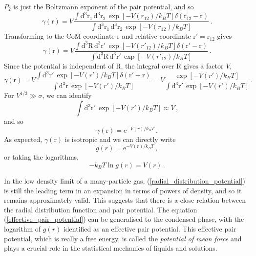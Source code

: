 \documentclass{article}
\theoremstyle{plain}\theoremheaderfont{\normalfont\itshape}\theorembodyfont{\rmfamily}\theoremseparator{.}\newtheorem*{rem}{Remark}\newtheorem*{ex}{Example}\newtheorem*{proof}{Proof}\newtheorem*{altp}{Alternative proof}
\theoremstyle{plain}\theoremheaderfont{\normalfont\bfseries}\theorembodyfont{\rmfamily}\theoremseparator{.}\newtheorem{thm}{Theorem}[section]\newtheorem{lem}[thm]{Lemma}\newtheorem{prop}[thm]{Proposition}\newtheorem*{cor}{Corollary}\newtheorem{defn}[thm]{Definition}\newtheorem{clm}[thm]{Claim}\newtheorem{clminproof}{Claim}\newtheorem{alg}[thm]{Algorithm}\newtheorem{hyp}[thm]{Hypothesis}\newtheorem{law}[thm]{Law}
\theoremstyle{break}\theoremheaderfont{\normalfont\itshape}\theorembodyfont{\rmfamily}\theoremseparator{.\medskip}\newtheorem*{proofskip}{Proof}\newtheorem*{exs}{Examples}\newtheorem*{rems}{Remarks}
\theoremstyle{break}\theoremheaderfont{\normalfont\bfseries}\theorembodyfont{\rmfamily}\theoremseparator{.\medskip}\newtheorem{lemskip}[thm]{Lemma}\newtheorem{defnskip}[thm]{Definition}\newtheorem{propskip}[thm]{Proposition}\newtheorem{thmskip}[thm]{Theorem}
\numberwithin{equation}{section}
\newcommand{\ee}{\mathrm{e}}
\newcommand{\dd}[2][]{\mathrm{d}^{#1} #2\,}
\newcommand{\vb}[1]{\bm{\mathrm{#1}}}
\begin{document}
    \(P_2\) is just the Boltzmann exponent of the pair potential, and so
    \begin{equation}
        \gamma(\vb{r})=V\frac{\int\dd[3]{\vb{r}_1}\dd[3]{\vb{r}_2}\exp[-V(r_{12})/k_B T]\delta(\vb{r}_{12}-\vb{r})}{\int\dd[3]{\vb{r}_1}\dd[3]{\vb{r}_2}\exp[-V(r_{12})/k_B T]}\,.
    \end{equation}
    Transforming to the CoM coordinate \(\vb{r}\) and relative coordinate \(\vb{r}'=\vb{r}_{12}\) gives
    \begin{equation}
        \gamma(\vb{r})=V\frac{\int\dd[3]{\vb{R}}\dd[3]{\vb{r}'}\exp[-V(r'_{12})/k_B T]\delta(\vb{r}'-\vb{r})}{\int\dd[3]{\vb{R}}\dd[3]{\vb{r}'}\exp[-V(r'_{12})/k_B T]}\,.
    \end{equation}
    Since the potential is independent of \(\vb{R}\), the integral over \(\vb{R}\) gives a factor \(V\),
    \begin{equation}
        \gamma(\vb{r})=V\frac{\int\dd[3]{\vb{r}'}\exp[-V(r')/k_B T]\delta(\vb{r}'-\vb{r})}{\int\dd[3]{\vb{r}}\exp[-V(r')/k_B T]}=V\frac{\exp[-V(r')/k_B T]}{\int\dd[3]{\vb{r}'}\exp[-V(r')/k_B T]}\,.
    \end{equation}
    For \(V^{1/3}\gg\sigma\), we can identify
    \begin{equation}
        \int\dd[3]{\vb{r}'}\exp[-V(r')/k_B T]\approx V\,,
    \end{equation}
    and so
    \begin{equation}
        \gamma(\vb{r})=\ee^{-V(r)/k_B T}\,.
    \end{equation}
    As expected, \(\gamma(\vb{r})\) is isotropic and we can directly write
    \begin{equation}\label{radial_distribution_potential}
        g(r)=\ee^{-V(r)/k_B T}\,,
    \end{equation}
    or taking the logarithms,
    \begin{equation}\label{effective_pair_potential}
        -k_B T\ln g(r)=V(r)\,.
    \end{equation}

    In the low density limit of a many-particle gas, (\ref{radial_distribution_potential}) is still the leading term in an expansion in terms of powers of density, and so it remains approximately valid. This suggests that there is a close relation between the radial distribution function and pair potential. The equation (\ref{effective_pair_potential}) can be generalised to the condensed phase, with the logarithm of \(g(r)\) identified as an effective pair potential. This effective pair potential, which is really a free energy, is called the \textit{potential of mean force} and plays a crucial role in the statistical mechanics of liquids and solutions.
\end{document}
